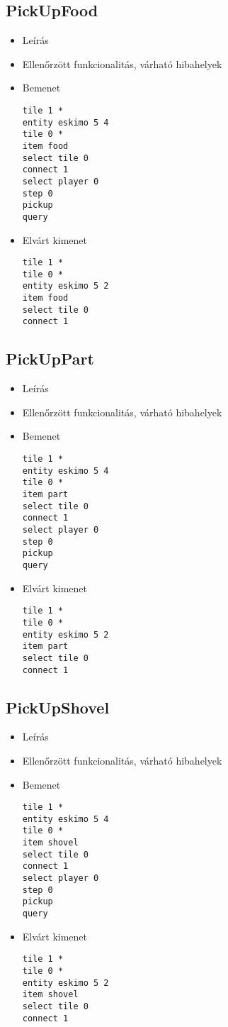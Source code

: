 \subsection{PickUpFood}
\begin{itemize}
\item Leírás\newline
\item Ellenőrzött funkcionalitás, várható hibahelyek
\item Bemenet
\begin{lstlisting}
tile 1 *
entity eskimo 5 4
tile 0 *
item food
select tile 0
connect 1
select player 0
step 0
pickup
query
\end{lstlisting}
\item Elvárt kimenet
\begin{lstlisting}
tile 1 *
tile 0 *
entity eskimo 5 2
item food
select tile 0
connect 1
\end{lstlisting}
\end{itemize}

\subsection{PickUpPart}
\begin{itemize}
\item Leírás\newline
\item Ellenőrzött funkcionalitás, várható hibahelyek
\item Bemenet
\begin{lstlisting}
tile 1 *
entity eskimo 5 4
tile 0 *
item part
select tile 0
connect 1
select player 0
step 0
pickup
query
\end{lstlisting}
\item Elvárt kimenet
\begin{lstlisting}
tile 1 *
tile 0 *
entity eskimo 5 2
item part
select tile 0
connect 1
\end{lstlisting}
\end{itemize}

\subsection{PickUpShovel}
\begin{itemize}
\item Leírás\newline
\item Ellenőrzött funkcionalitás, várható hibahelyek
\item Bemenet
\begin{lstlisting}
tile 1 *
entity eskimo 5 4
tile 0 *
item shovel
select tile 0
connect 1
select player 0
step 0
pickup
query
\end{lstlisting}
\item Elvárt kimenet
\begin{lstlisting}
tile 1 *
tile 0 *
entity eskimo 5 2
item shovel
select tile 0
connect 1
\end{lstlisting}
\end{itemize}

